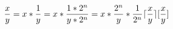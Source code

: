 \documentclass{article}
\DeclarePairedDelimiter\ceil{\lceil}{\rceil}
\begin{document}
\begin{equation*}
    \frac{x}{y} = x * \frac{1}{y} = x * \frac{1 * 2^{n}}{y * 2^{n}} = x * \frac{2^{n}}{y} * \frac{1}{2^{n}}
    \ceil{\frac{x}{y}}
    [\frac{x}{y}]
\end{equation*}
\end{document}
